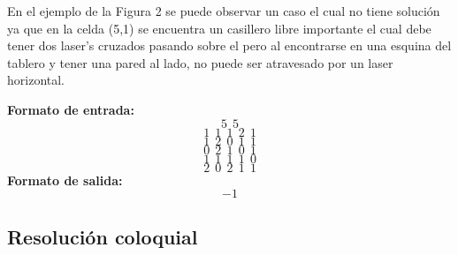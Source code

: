 \begin{itemize}
En el ejemplo de la Figura 2 se puede observar un caso el cual no tiene solución ya que en la celda (5,1) se encuentra un casillero libre importante el cual debe tener dos laser's cruzados pasando sobre el pero al encontrarse en una esquina del tablero y tener una pared al lado, no puede ser atravesado por un laser horizontal.

\textbf{Formato de entrada:} 
$$5\ \ 5$$
$$1\ \ 1\ \ 1\ \ 2\ \ 1$$
$$1\ \ 2\ \ 0\ \ 1\ \ 1$$
$$0\ \ 2\ \ 1\ \ 0\ \ 1$$
$$1\ \ 1\ \ 1\ \ 1\ \ 0$$
$$2\ \ 0\ \ 2\ \ 1\ \ 1$$
\textbf{Formato de salida:} $$-1$$\newline
\end{itemize}

\subsection{Resolución coloquial}

